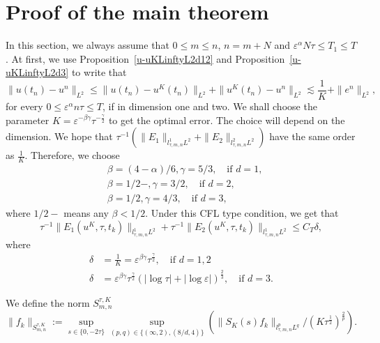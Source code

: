 \documentclass[10pt,a4paper]{article}
\begin{document}
  \section{Proof of the main theorem}\label{sec:proof-main}
  In this section, we always assume that \(0\leq m\leq n\), \(n=m+N\) and
  \(\varepsilon^\alpha N\tau \leq T_1 \leq T\). 
  At first, we use Proposition~\ref{u-uKLinftyL2d12} and
  Proposition~\ref{u-uKLinftyL2d3} to write that 
  \[ \| u(t_n) - u^n \|_{L^2} \leq \|u(t_n) - u^K(t_n)\|_{L^2} + \|u^K(t_n) - u^n\|_{L^2}
  \lesssim \frac1K + \|e^n\|_{L^2}, \]
  for every \( 0 \leq \varepsilon^\alpha n\tau \leq T\), if in dimension one and
  two.
  We shall choose the parameter \(K = \varepsilon^{-\beta\gamma} \tau^{-\frac\gamma2}\)
  to get the optimal error. The choice will depend on the dimension. 
  We hope that \(\tau^{-1}(\|E_1\|_{l^1_{\tau,m,n} L^2} + \|E_2\|_{l^2_{\tau,m,n} L^2})\)
  have the same order as \(\frac1K\). Therefore, we choose
  \begin{equation}\label{bg}
    \begin{aligned}
      & \beta = (4-\alpha)/6, \gamma = 5/3 ,\quad \text{if } d=1, \\ 
      & \beta = 1/2-, \gamma = 3/2, \quad \text{if } d=2, \\ 
      & \beta = 1/2, \gamma = 4/3, \quad \text{if } d=3, 
    \end{aligned}
  \end{equation}
  where \(1/2-\) means any \(\beta < 1/2.\) 
  Under this CFL type condition, we get that 
  \begin{equation}\label{F1F2linftyL2}
    \tau^{-1}\|E_1(u^K,\tau,t_k)\|_{l^1_{\tau,m,n} L^2} + 
    \tau^{-1}\|E_2(u^K,\tau,t_k)\|_{l^1_{\tau,m,n} L^2} \leq C_T \delta,
  \end{equation}
  where
  \begin{equation}\label{delta}
    \begin{aligned}
      \delta &= \frac1K = \varepsilon^{\beta\gamma} \tau^{\frac\gamma2}, \quad \text{if } d=1,2\\ 
      \delta &= \varepsilon^{\beta\gamma} \tau^{\frac\gamma2}(|\log\tau|+|\log\varepsilon|)^\frac23,
      \quad \text{if } d=3 .
    \end{aligned}
  \end{equation}

  We define the norm \(S^{\tau,K}_{m,n}\)
  \[ \|f_k\|_{S^{\tau,K}_{m,n}} := \sup_{s \in \{0,-2\tau\}}\sup_{(p,q) \in \{(\infty,2),(8/d,4)\}} 
  (\|S_K(s)f_k\|_{l^p_{\tau,m,n} L^q} / (K\tau^\frac12)^\frac2p). \]
\end{document}
